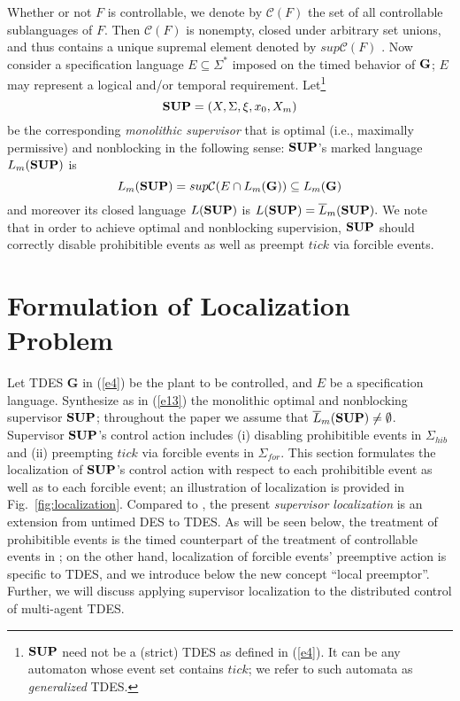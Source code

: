 \documentclass[twocolumn]{autart}
\begin{document}
Whether or not $F$ is controllable, we denote by $\mathcal{C}(F)$
the set of all controllable sublanguages of $F$. Then
$\mathcal{C}(F)$ is nonempty, closed under arbitrary set unions, and
thus contains a unique supremal element denoted by
$sup\mathcal{C}(F)$ \cite{BrandinWonham:94,Wonham:2011a}. Now
consider a specification language $E \subseteq \Sigma^*$ imposed on
the timed behavior of $\bf G$; $E$ may represent a logical and/or
temporal requirement. Let\footnote{${\bf SUP}$ need not be a
(strict) TDES as defined in (\ref{e4}). It can be any automaton
whose event set contains $tick$; we refer to such automata as
\emph{generalized} TDES.}
\begin{equation}\label{e12a}
{\bf SUP} = (X, \Sigma, \xi, x_0, X_m)
\end{equation}
be the corresponding \emph{monolithic supervisor} that is optimal
(i.e., maximally permissive) and nonblocking in the following sense:
$\bf SUP$'s marked language $L_m({\bf SUP})$ is
\begin{equation} \label{e13}
L_m({\bf SUP}) = sup\mathcal{C}(E\cap L_m({\bf G})) \subseteq
L_m(\bf G)
\end{equation}
and moreover its closed language $L({\bf SUP})$ is $L({\bf SUP}) =
\overline{L}_m({\bf SUP}).$
We note that in order to achieve optimal and nonblocking
supervision, $\bf SUP$ should correctly disable prohibitible events
as well as preempt $tick$ via forcible events.



\section{Formulation of Localization Problem}\label{sec:3}

Let TDES $\textbf{G}$ in (\ref{e4}) be the plant to be controlled,
and $E$ be a specification language. Synthesize as in (\ref{e13})
the monolithic optimal and nonblocking supervisor $\bf SUP$;
throughout the paper we assume that $\overline{L}_m({\bf SUP}) \neq
\emptyset$. Supervisor $\bf SUP$'s control action includes (i)
disabling prohibitible events in $\Sigma_{hib}$ and (ii) preempting
$tick$ via forcible events in $\Sigma_{for}$. This section
formulates the localization of $\bf SUP$'s control action with
respect to each prohibitible event as well as to each forcible
event; an illustration of localization is provided in
Fig.~\ref{fig:localization}. Compared to \cite{CaiWonham:2010a}, the
present \emph{supervisor localization} is an extension from untimed
DES to TDES. As will be seen below, the treatment of prohibitible
events is the timed counterpart of the treatment of controllable
events in \cite{CaiWonham:2010a}; on the other hand, localization of
forcible events' preemptive action is specific to TDES,
and we introduce below the new concept ``local preemptor''.
Further, we will discuss applying supervisor localization to the
distributed control of multi-agent TDES.
\end{document}
